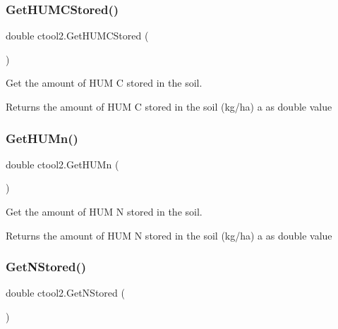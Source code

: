 \subsubsection{\texorpdfstring{GetHUMCStored()}{GetHUMCStored()}}
{\footnotesize\ttfamily double ctool2.\+Get\+H\+U\+M\+C\+Stored (\begin{DoxyParamCaption}{ }\end{DoxyParamCaption})\hspace{0.3cm}{\ttfamily [inline]}}



Get the amount of H\+UM C stored in the soil. 

\begin{DoxyReturn}{Returns}
the amount of H\+UM C stored in the soil (kg/ha) a as double value 
\end{DoxyReturn}
\mbox{\label{classctool2_a4a12ce36b7e85a06e7987e953b08b876}} 
\subsubsection{\texorpdfstring{GetHUMn()}{GetHUMn()}}
{\footnotesize\ttfamily double ctool2.\+Get\+H\+U\+Mn (\begin{DoxyParamCaption}{ }\end{DoxyParamCaption})\hspace{0.3cm}{\ttfamily [inline]}}



Get the amount of H\+UM N stored in the soil. 

\begin{DoxyReturn}{Returns}
the amount of H\+UM N stored in the soil (kg/ha) a as double value 
\end{DoxyReturn}
\mbox{\label{classctool2_a17a35e9c9faa7486c87fea08796c64de}} 
\subsubsection{\texorpdfstring{GetNStored()}{GetNStored()}}
{\footnotesize\ttfamily double ctool2.\+Get\+N\+Stored (\begin{DoxyParamCaption}{ }\end{DoxyParamCaption})\hspace{0.3cm}{\ttfamily [inline]}}



